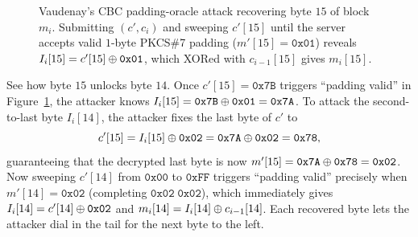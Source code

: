 \begin{figure}[htbp]
\caption{Vaudenay's CBC padding-oracle attack recovering byte $15$ of block $m_i$. Submitting $(c', c_i)$ and sweeping $c'[15]$ until the server accepts valid $1$-byte PKCS\#7 padding ($m'[15] = \mathtt{0x01}$) reveals $I_i[15] = c'[15] \oplus \mathtt{0x01}$, which XORed with $c_{i-1}[15]$ gives $m_i[15]$.}
\label{ch13:fig-padding-oracle}
\end{figure}

\begin{intuitionbox}
See how byte $15$ unlocks byte $14$. Once $c'[15] = \mathtt{0x7B}$ triggers ``padding valid'' in Figure~\ref{ch13:fig-padding-oracle}, the attacker knows $I_i[15] = \mathtt{0x7B} \oplus \mathtt{0x01} = \mathtt{0x7A}$. To attack the second-to-last byte $I_i[14]$, the attacker fixes the last byte of $c'$ to
\[
c'[15] = I_i[15] \oplus \mathtt{0x02} = \mathtt{0x7A} \oplus \mathtt{0x02} = \mathtt{0x78},
\]
guaranteeing that the decrypted last byte is now $m'[15] = \mathtt{0x7A} \oplus \mathtt{0x78} = \mathtt{0x02}$. Now sweeping $c'[14]$ from $\mathtt{0x00}$ to $\mathtt{0xFF}$ triggers ``padding valid'' precisely when $m'[14] = \mathtt{0x02}$ (completing $\mathtt{0x02\;0x02}$), which immediately gives $I_i[14] = c'[14] \oplus \mathtt{0x02}$ and $m_i[14] = I_i[14] \oplus c_{i-1}[14]$. Each recovered byte lets the attacker dial in the tail for the next byte to the left.
\end{intuitionbox}

